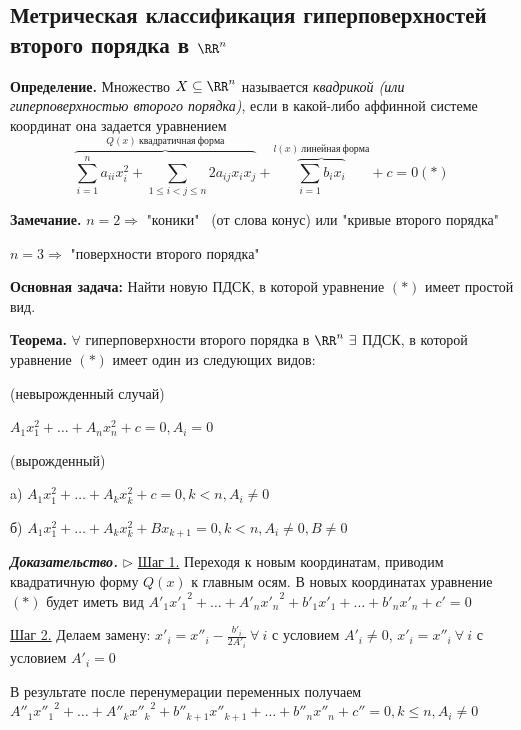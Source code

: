 \subsection{Метрическая классификация гиперповерхностей второго порядка в $\RR^n$}

\textbf{Определение.} Множество $X \subseteq \RR^n$ называется \textit{квадрикой (или гиперповерхностью второго порядка)}, если в какой-либо аффинной системе координат она задается уравнением \begin{equation*}\overbrace{\sum\limits_{i=1}^n a_{ii} x_i^2 + \sum\limits_{1 \leqslant i < j \leqslant n} 2 a_{ij} x_i x_j}^{Q(x) \ квадратичная \ форма} + \overbrace{\sum\limits_{i=1} b_i x_i}^{l(x) \ линейная \ форма} + c = 0 (*)\end{equation*}

\bigskip
\textbf{Замечание.} $n = 2 \Rightarrow$ "коники" \ (от слова конус) или "кривые второго порядка"

$n = 3 \Rightarrow$ "поверхности второго порядка"

\bigskip
\textbf{Основная задача:} Найти новую ПДСК, в которой уравнение $(*)$ имеет простой вид.

\bigskip
\textbf{Теорема.} $\forall$ гиперповерхности второго порядка в $\RR^n \ \exists$ ПДСК, в которой уравнение $(*)$ имеет один из следующих видов:

\bigskip
{} (невырожденный случай)

$A_1 x_1^2 + \dots + A_n x_n^2 + c = 0, A_i = 0$

\bigskip
{} (вырожденный)

a) $A_1 x_1^2 + \dots + A_k x_k^2 + c = 0, k < n, A_i \neq 0$

б) $A_1 x_1^2 + \dots + A_k x_k^2 + B x_{k+1} = 0, k < n, A_i \neq 0, B \neq 0$

\bigskip
\textbf{\textit{Доказательство.}} $\rhd$ \underline{Шаг 1.} Переходя к новым координатам, приводим квадратичную форму $Q(x)$ к главным осям. В новых координатах уравнение $(*)$ будет иметь вид $A'_1 {x'_1}^2 + \dots + A'_n {x'_n}^2 + b'_1 x'_1 + \dots + b'_n x'_n + c' = 0$

\underline{Шаг 2.} Делаем замену: $x'_i = x''_i - \frac{b'_i}{2A'_i} \ \forall \ i$ с условием $A'_i \neq 0$, $x'_i = x''_i \ \forall \ i$ с условием $A'_i = 0$

В результате после перенумерации переменных получаем $A''_1 {x''_1}^2 + \dots + A''_k {x''_k}^2 + b''_{k+1} x''_{k+1} + \dots + b''_n x''_n + c'' = 0, k \leqslant n, A_i \neq 0$

